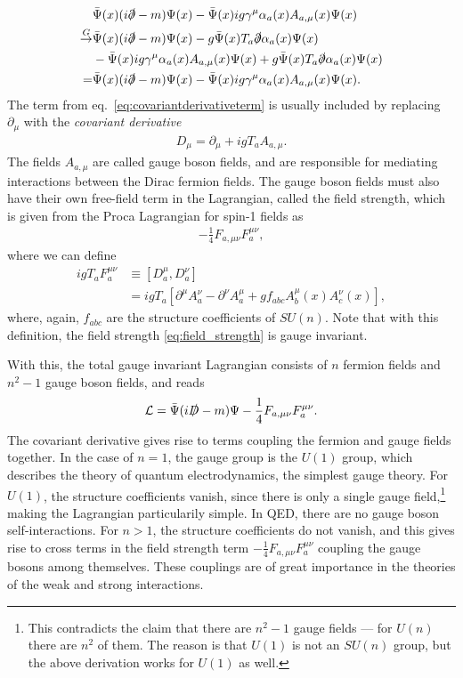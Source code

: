 \documentclass[twoside,english]{uiofysmaster}
\begin{document}
\begin{align}
	&\bar\Psi(x)(i\slashed\partial - m)\Psi(x) - \bar\Psi(x) ig\gamma^\mu \alpha_a(x)A_{a,\mu}(x) \Psi(x)\nonumber\\
	\overset{G}{\to} &\bar\Psi(x)(i\slashed\partial - m)\Psi(x) - g\bar\Psi(x) T_a\slashed\partial \alpha_a(x) \Psi(x)\\
	 &- \bar\Psi(x) ig\gamma^\mu \alpha_a(x)A_{a,\mu}(x) \Psi(x) +  g\bar\Psi(x) T_a\slashed\partial \alpha_a(x) \Psi(x)\nonumber\\
	 = &\bar\Psi(x)(i\slashed\partial - m)\Psi(x) - \bar\Psi(x) ig\gamma^\mu \alpha_a(x)A_{a,\mu}(x) \Psi(x).\nonumber
\end{align}
The term from eq.\ \eqref{eq:covariantderivativeterm} is usually included by replacing $\partial_\mu$ with the {\it covariant derivative}
\begin{align}
	D_\mu = \partial_\mu + igT_a A_{a,\mu}.
\end{align}
The fields $A_{a,\mu}$ are called gauge boson fields, and are responsible for mediating interactions between the Dirac fermion fields. The gauge boson fields must also have their own free-field term in the Lagrangian, called the field strength, which is given from the Proca Lagrangian for spin-1 fields as 
\begin{align}
	-\frac{1}{4} F_{a,\mu\nu} F_a^{\mu\nu},\label{eq:field_strength}
\end{align}
where we can define
\begin{align}
	igT_a F_{a}^{\mu\nu} &\equiv [D_a^\mu, D_a^\nu] \\
	&= igT_a \left[ \partial^\mu A_a^\nu - \partial^\nu A_a^\mu + g f_{abc} A_b^{\mu}(x)A_c^{\nu}(x) \right],
\end{align}
where, again, $f_{abc}$ are the structure coefficients of $SU(n)$. Note that with this definition, the field strength \eqref{eq:field_strength} is gauge invariant.

With this, the total gauge invariant Lagrangian consists of $n$ fermion fields and $n^2-1$ gauge boson fields, and reads
\begin{align}
	\mathcal{L} = \bar\Psi(i\slashed D - m)\Psi - \frac{1}{4} F_{a,\mu\nu} F_a^{\mu\nu}.
\end{align}
The covariant derivative gives rise to terms coupling the fermion and gauge fields together. In the case of $n=1$, the gauge group is the $U(1)$ group, which describes the theory of quantum electrodynamics, the simplest gauge theory. For $U(1)$, the structure coefficients vanish, since there is only a single gauge field,\footnote{This contradicts the claim that there are $n^2-1$ gauge fields --- for $U(n)$ there are $n^2$ of them. The reason is that $U(1)$ is not an $SU(n)$ group, but the above derivation works for $U(1)$ as well.} making the Lagrangian particularily simple. In QED, there are no gauge boson self-interactions. For $n>1$, the structure coefficients do not vanish, and this gives rise to cross terms in the field strength term $-\frac{1}{4} F_{a,\mu\nu} F_a^{\mu\nu}$ coupling the gauge bosons among themselves. These couplings are of great importance in the theories of the weak and strong interactions.
\end{document}
